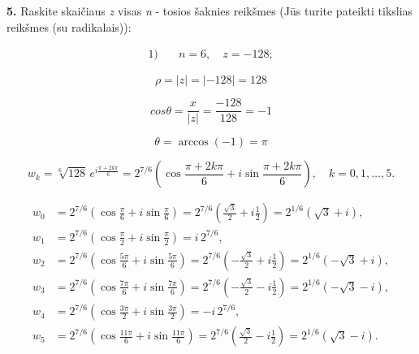 \documentclass{article}
\begin{document}
\pagebreak



\textbf{5.} Raskite skaičiaus \textit{z} visas \textit{n} - tosios šaknies reikšmes (Jūs turite pateikti tikslias reikšmes (su radikalais)):

\begin{align}
\text{1)}\quad & n=6,\quad z=-128; \nonumber
\end{align}


\begin{equation}
\rho=|z|=|-128|=128 \tag{1} 
\end{equation}

\begin{equation}
cos\theta = \frac{x}{|z|}=\frac{-128}{128}=-1 \tag{2} 
\end{equation}

\begin{equation}
\theta=\arccos(-1)=\pi\tag{3} 
\end{equation}

\vspace{5mm}

\[
w_k = \sqrt[6]{128}\, e^{i\frac{\pi+2k\pi}{6}}
= 2^{7/6}\left(\cos\frac{\pi+2k\pi}{6}+i\sin\frac{\pi+2k\pi}{6}\right), 
\quad k=0,1,\dots,5.
\]
\vspace{3mm}

\[
\begin{aligned}
w_0 &= 2^{7/6}\left(\cos\frac{\pi}{6}+i\sin\frac{\pi}{6}\right) 
= 2^{7/6}\left(\tfrac{\sqrt{3}}{2}+i\tfrac{1}{2}\right)
= 2^{1/6}(\sqrt{3}+i), \\[6pt]
w_1 &= 2^{7/6}\left(\cos\frac{\pi}{2}+i\sin\frac{\pi}{2}\right) 
= i\,2^{7/6}, \\[6pt]
w_2 &= 2^{7/6}\left(\cos\frac{5\pi}{6}+i\sin\frac{5\pi}{6}\right) 
= 2^{7/6}\left(-\tfrac{\sqrt{3}}{2}+i\tfrac{1}{2}\right)
= 2^{1/6}(-\sqrt{3}+i), \\[6pt]
w_3 &= 2^{7/6}\left(\cos\frac{7\pi}{6}+i\sin\frac{7\pi}{6}\right) 
= 2^{7/6}\left(-\tfrac{\sqrt{3}}{2}-i\tfrac{1}{2}\right)
= 2^{1/6}(-\sqrt{3}-i), \\[6pt]
w_4 &= 2^{7/6}\left(\cos\frac{3\pi}{2}+i\sin\frac{3\pi}{2}\right) 
= -i\,2^{7/6}, \\[6pt]
w_5 &= 2^{7/6}\left(\cos\frac{11\pi}{6}+i\sin\frac{11\pi}{6}\right) 
= 2^{7/6}\left(\tfrac{\sqrt{3}}{2}-i\tfrac{1}{2}\right)
= 2^{1/6}(\sqrt{3}-i).
\end{aligned}
\]
\end{document}
